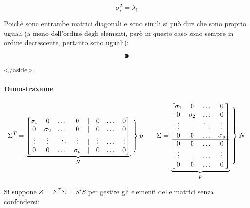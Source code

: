 $$
\sigma_i^2=\lambda_i
$$

Poichè sono entrambe matrici diagonali e sono simili si può dire che sono proprio uguali (a meno dell'ordine degli elementi, però in questo caso sono sempre in ordine decrescente, pertanto sono uguali):

$$
⁍
$$

</aside>

\paragraph{Dimostrazione}

$$
\Sigma^T = \underbrace{
	\begin{bmatrix} 
		\sigma_1 & 0 & \dots & 0 & \mid & 0 & \dots & 0 \\
		0 & \sigma_2 & \dots & 0 & \mid & 0 & \dots & 0 \\
		\vdots & \vdots & \ddots & \vdots & \mid & \vdots & \dots & \vdots \\
		0 & 0 & \dots & \sigma_p & \mid & 0 & \dots & 0 
	\end{bmatrix}
}_N
\left. \vphantom{\begin{bmatrix} 0 \\ 0 \\ 0 \\ 0 \end{bmatrix}} \right\} p
\qquad

\Sigma = \underbrace{
	\begin{bmatrix} 
		\sigma_1 & 0 & \dots & 0 \\
		0 & \sigma_2 & \dots & 0 \\
		\vdots & \vdots & \ddots & \vdots \\
		0 & 0 & \dots & \sigma_p \\
		\hline
		0 & 0 & \dots & 0 \\
		\vdots & \vdots & \dots & \vdots \\
		0 & 0 & \dots & 0 
	\end{bmatrix}
}_p
\left. \vphantom{\begin{bmatrix} 0 \\ 0 \\ 0 \\ 0 \\ 0 \\ 0 \\ 0 \end{bmatrix}} \right\} N

$$

Si suppone $Z = \Sigma^T \Sigma = S' S$ per gestire gli elementi delle matrici senza confondersi:

